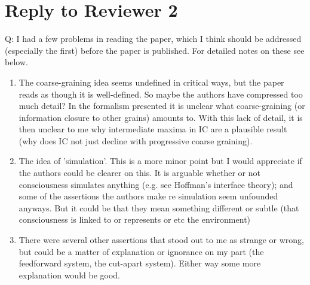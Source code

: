 \documentclass[utf8]{article}
\newcounter{cQuestion}[section]
\newenvironment{question}
    {\refstepcounter{cQuestion}\color{Blue}\noindent\newline Q\thecQuestion:}
    {~\newline}
\begin{document}
    \section{Reply to Reviewer 2}
        \begin{question}
			I had a few problems in reading the paper, which I think should be addressed (especially the first) before the paper is published. For detailed notes on these see below.
			
			\begin{enumerate}
				\item The coarse-graining idea seems undefined in critical ways, but the paper reads as though it is well-defined. So maybe the authors have compressed too much detail? In the formalism presented it is unclear what coarse-graining (or information closure to other grains) amounts to. With this lack of detail, it is then unclear to me why intermediate maxima in IC are a plausible result (why does IC not just decline with progressive coarse graining).
				
				\item The idea of 'simulation'. This is a more minor point but I would appreciate if the authors could be clearer on this. It is arguable whether or not consciousness simulates anything (e.g. see Hoffman's interface theory); and some of the assertions the authors make re simulation seem unfounded anyways. But it could be that they mean something different or subtle (that consciousness is linked to or represents or etc the environment)
				
				\item There were several other assertions that stood out to me as strange or wrong, but could be a matter of explanation or ignorance on my part (the feedforward system, the cut-apart system). Either way some more explanation would be good.
			\end{enumerate}
        \end{question}
    
\end{document}
